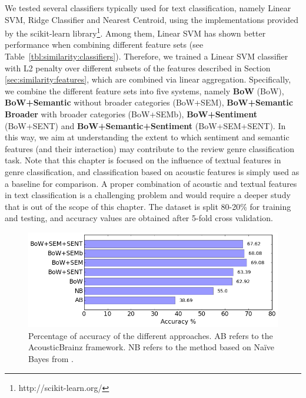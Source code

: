 We tested several classifiers typically used for text classification, namely Linear SVM, Ridge Classifier and Nearest Centroid, using the implementations provided by the scikit-learn library\footnote{http://scikit-learn.org/}. Among them, Linear SVM has shown better performance when combining different feature sets (see Table~\ref{tbl:similarity:classifiers}). Therefore, we trained a Linear SVM classifier with L2 penalty over different subsets of the features described in Section \ref{sec:similarity:features}, which are combined via linear aggregation. Specifically, we combine the different feature sets into five systems, namely \textbf{BoW} (BoW), \textbf{BoW+Semantic} without broader categories (BoW+SEM), \textbf{BoW+Semantic Broader} with broader categories (BoW+SEMb), \textbf{BoW+Sentiment} (BoW+SENT) and \textbf{BoW+Semantic+Sentiment} (BoW+SEM+SENT). In this way, we aim at understanding the extent to which sentiment and semantic features (and their interaction) may contribute to the review genre classification task. Note that this chapter is focused on the influence of textual features in genre classification, and classification based on acoustic features is simply used as a baseline for comparison. A proper combination of acoustic and textual features in text classification is a challenging problem and would require a deeper study that is out of the scope of this chapter.
The dataset is split 80-20\% for training and testing, and accuracy values are obtained after 5-fold cross validation. 

\begin{figure}
    \centering
    \includegraphics[width=\columnwidth]{ch06_similarity/pics/results2.png}
    \caption{Percentage of accuracy of the different approaches. AB refers to the AcousticBrainz framework. NB refers to the method based on Na\"{i}ve Bayes from \cite{Hu2005}.}
    \label{fig:similarity:results}
\end{figure}

